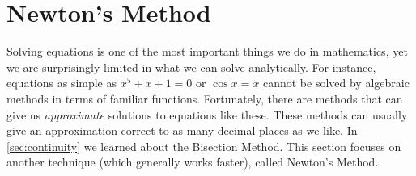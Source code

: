 \section{Newton's Method}\label{sec:newton}

Solving equations is one of the most important things we do in mathematics, yet we are surprisingly limited in what we can solve analytically.  For instance, equations as simple as $x^5+x+1=0$ or $\cos x =x $ cannot be solved by algebraic methods in terms of familiar functions.  Fortunately, there are methods that can give us \emph{approximate} solutions to equations like these.  These methods can usually give an approximation correct to as many decimal places as we like. In \autoref{sec:continuity} we learned about the Bisection Method.  This section focuses on another technique (which generally works faster), called Newton's Method.

